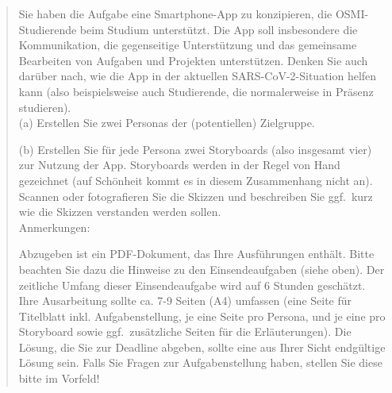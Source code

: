 \documentclass{article}
\begin{document}
\begin{quote}
	Sie haben die Aufgabe eine Smartphone-App zu konzipieren, die
	OSMI-Studierende beim Studium unterstützt.  Die App soll insbesondere die
	Kommunikation, die gegenseitige Unterstützung und das gemeinsame Bearbeiten
	von Aufgaben und Projekten unterstützen. Denken Sie auch darüber nach, wie
	die App in der aktuellen SARS-CoV-2-Situation helfen kann (also
	beispielsweise auch Studierende, die normalerweise in Präsenz studieren).
	\\[1em]
	(a) Erstellen Sie zwei Personas der (potentiellen) Zielgruppe.

	(b) Erstellen Sie für jede Persona zwei Storyboards (also insgesamt vier)
	zur Nutzung der App. Storyboards werden in der Regel von Hand gezeichnet
	(auf Schönheit kommt es in diesem Zusammenhang nicht an). Scannen oder
	fotografieren Sie die Skizzen und beschreiben Sie ggf.\ kurz wie die Skizzen
	verstanden werden sollen.
	\\[1em]
	Anmerkungen:

	Abzugeben ist ein PDF-Dokument, das Ihre Ausführungen enthält. Bitte
	beachten Sie dazu die Hinweise zu den Einsendeaufgaben (siehe oben). Der
	zeitliche Umfang dieser Einsendeaufgabe wird auf 6 Stunden geschätzt.  Ihre
	Ausarbeitung sollte ca. 7-9 Seiten (A4) umfassen (eine Seite für Titelblatt
	inkl. Aufgabenstellung, je eine Seite pro Persona, und je eine pro
	Storyboard sowie ggf.\ zusätzliche Seiten für die Erläuterungen).  Die
	Lösung, die Sie zur Deadline abgeben, sollte eine aus Ihrer Sicht
	endgültige Lösung sein. Falls Sie Fragen zur Aufgabenstellung haben,
	stellen Sie diese bitte im Vorfeld!
\end{quote}

\newpage



\newpage



\newpage



\newpage



\newpage



\newpage


\end{document}
